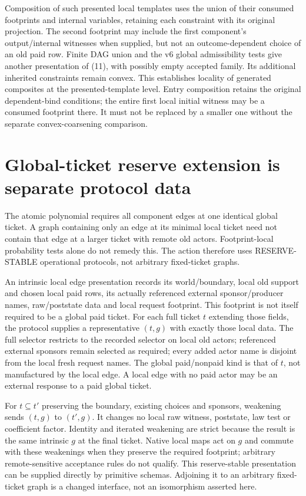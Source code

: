 \documentclass[11pt]{article}
\begin{document}
Composition of such presented local templates uses the union of their consumed footprints and internal variables, retaining each constraint with its original projection. The second footprint may include the first component's output/internal witnesses when supplied, but not an outcome-dependent choice of an old paid row. Finite DAG union and the v6 global admissibility tests give another presentation of (11), with possibly empty accepted family. Its additional inherited constraints remain convex. This establishes locality of generated composites at the presented-template level. Entry composition retains the original dependent-bind conditions; the entire first local initial witness may be a consumed footprint there. It must not be replaced by a smaller one without the separate convex-coarsening comparison.

\section{Global-ticket reserve extension is separate protocol data}
The atomic polynomial requires all component edges at one identical global ticket. A graph containing only an edge at its minimal local ticket need not contain that edge at a larger ticket with remote old actors. Footprint-local probability tests alone do not remedy this. The action therefore uses RESERVE-STABLE operational protocols, not arbitrary fixed-ticket graphs.

An intrinsic local edge presentation records its world/boundary, local old support and chosen local paid rows, its actually referenced external sponsor/producer names, raw/poststate data and local request footprint. This footprint is not itself required to be a global paid ticket. For each full ticket $t$ extending those fields, the protocol supplies a representative $(t,g)$ with exactly those local data. The full selector restricts to the recorded selector on local old actors; referenced external sponsors remain selected as required; every added actor name is disjoint from the local fresh request names. The global paid/nonpaid kind is that of $t$, not manufactured by the local edge. A local edge with no paid actor may be an external response to a paid global ticket.

For $t\subseteq t'$ preserving the boundary, existing choices and sponsors, weakening sends $(t,g)$ to $(t',g)$. It changes no local raw witness, poststate, law test or coefficient factor. Identity and iterated weakening are strict because the result is the same intrinsic $g$ at the final ticket. Native local maps act on $g$ and commute with these weakenings when they preserve the required footprint; arbitrary remote-sensitive acceptance rules do not qualify. This reserve-stable presentation can be supplied directly by primitive schemas. Adjoining it to an arbitrary fixed-ticket graph is a changed interface, not an isomorphism asserted here.
\end{document}
